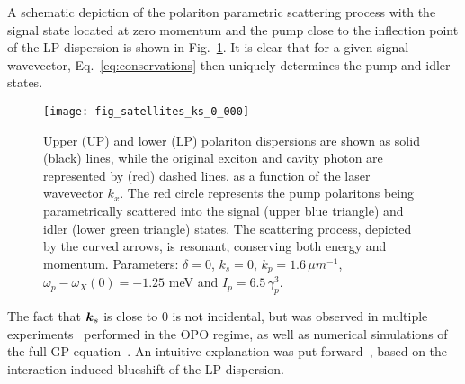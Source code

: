A schematic depiction of the polariton parametric scattering process
with the signal state located at zero momentum and the pump close to
the inflection point of the LP dispersion is shown in
Fig.~\ref{fig:parametric-scattering}. It is clear that for a given
signal wavevector, Eq.~\eqref{eq:conservations} then uniquely
determines the pump and idler states.
%
\begin{figure}[tb]\centering
  \texttt{[image: fig\_satellites\_ks\_0\_000]}
  \caption{
    Upper (UP) and lower (LP) polariton dispersions are shown as solid
    (black) lines, while the original exciton and cavity photon are
    represented by (red) dashed lines, as a function of the laser
    wavevector $k_x$. The red circle represents the pump polaritons being
    parametrically scattered into the signal (upper blue triangle) and
    idler (lower green triangle) states. The scattering process, depicted
    by the curved arrows, is resonant, conserving both energy and
    momentum. Parameters: $\delta = 0$, $k_s = 0$, $k_p = 1.6\, \mu
    m^{-1}$, $\omega_p - \omega_X(0)= -1.25$ meV and $I_p =
    6.5\, \gamma_p^3$.
  }\label{fig:parametric-scattering}
\end{figure}
%
The fact that $\bm{k}_s$ is close to $0$ is not incidental, but was
observed in multiple experiments~\cite{Stevenson2000,Baumberg2000}
performed in the OPO regime, as well as numerical simulations of the
full GP equation~\cite{9783642241857}. An intuitive explanation was
put forward~\cite{Gippius2004,Whittaker_2005}, based on the
interaction-induced blueshift of the LP dispersion.

